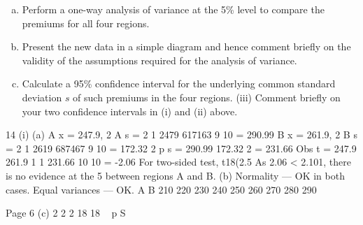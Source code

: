 \documentclass[a4paper,12pt]{article}
\begin{document}
\begin{enumerate}
\begin{enumerate}[(a)]
\item Perform a one-way analysis of variance at the 5\% level to
compare the premiums for all four regions.
\item Present the new data in a simple diagram and hence comment
briefly on the validity of the assumptions required for the
analysis of variance.
\item Calculate a 95\% confidence interval for the underlying common
standard deviation $s$ of such premiums in the four regions. 
(iii) Comment briefly on your two confidence intervals in (i) and (ii)
above. 
\end{enumerate}




\newpage

\end{enumerate}
\newpage


14 (i) (a) A
x = 247.9, 2
A
s =
2 1 2479
617163
9 10
= 290.99
B
x = 261.9, 2
B
s =
2 1 2619
687467
9 10
= 172.32
2
p
s =
290.99 172.32
2
= 231.66
Obs t =
247.9 261.9
1 1
231.66
10 10
= -2.06
For two-sided test, t18(2.5%
As 2.06 < 2.101, there is no evidence at the 5%
between regions A and B.
(b)
Normality — OK in both cases.
Equal variances — OK.
A
B
210 220 230 240 250 260 270 280 290

Page 6
(c)
2
2
2 18
18
~ p
S
\end{document}
